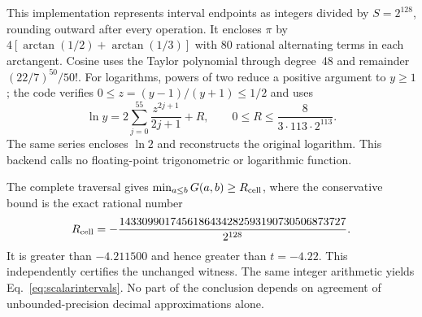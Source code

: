 \documentclass[aps,pra,reprint,amsmath,amssymb,longbibliography,nofootinbib]{revtex4-2}
\begin{document}
This implementation represents interval endpoints as integers divided by
$S=2^{128}$, rounding outward after every operation. It encloses $\pi$ by
$4[\arctan(1/2)+\arctan(1/3)]$ with 80 rational alternating terms in each
arctangent. Cosine uses the Taylor polynomial through degree~48 and remainder
$(22/7)^{50}/50!$. For logarithms, powers of two reduce a positive argument
to $y\geq1$; the code verifies $0\leq z=(y-1)/(y+1)\leq1/2$ and uses
\begin{equation}
 \ln y=2\sum_{j=0}^{55}\frac{z^{2j+1}}{2j+1}+R,
 \qquad 0\leq R\leq\frac{8}{3\cdot113\cdot2^{113}}.
\end{equation}
The same series encloses $\ln2$ and reconstructs the original logarithm.
This backend calls no floating-point trigonometric or logarithmic function.

The complete traversal gives $\min_{a\leq b}G(a,b)\geq R_{\rm cell}$, where
the conservative bound is the exact rational number
\begin{equation}
 R_{\rm cell}=
 -\frac{1433099017456186434282593190730506873727}
 {2^{128}}.
 \label{eq:integercell}
\end{equation}
It is greater than $-4.211500$ and hence greater than $t=-4.22$.
This independently certifies the unchanged witness. The same integer
arithmetic yields Eq.~\eqref{eq:scalarintervals}. No part of the conclusion
depends on agreement of unbounded-precision decimal approximations alone.


\end{document}

